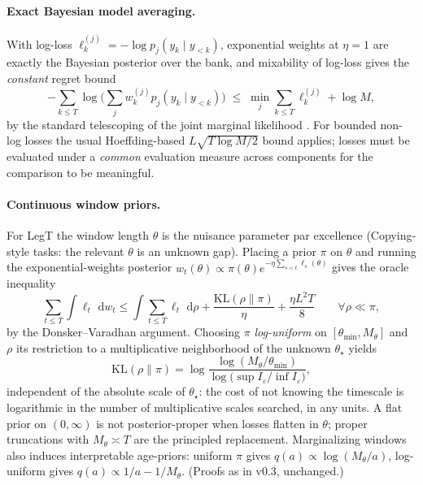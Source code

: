 \documentclass[11pt]{article}
\newcommand{\dd}{\,\mathrm{d}}
\newcommand{\KL}{\mathrm{KL}}
\begin{document}
\paragraph{Exact Bayesian model averaging.} With log-loss $\ell^{(j)}_k=-\log p_j(y_k\mid y_{<k})$, exponential weights at $\eta=1$ are exactly the Bayesian posterior over the bank, and mixability of log-loss gives the \emph{constant} regret bound
\begin{equation}
    -\sum_{k\le T}\log\Big(\textstyle\sum_j w^{(j)}_k p_j(y_k\mid y_{<k})\Big)
    \;\le\;
    \min_{j}\sum_{k\le T}\ell^{(j)}_k+\log M,
\end{equation}
by the standard telescoping of the joint marginal likelihood \citep{vovk1998mixability,cesa2006prediction}. For bounded non-log losses the usual Hoeffding-based $L\sqrt{T\log M/2}$ bound applies; losses must be evaluated under a \emph{common} evaluation measure across components for the comparison to be meaningful.

\paragraph{Continuous window priors.} For LegT the window length $\theta$ is the nuisance parameter par excellence (Copying-style tasks: the relevant $\theta$ is an unknown gap). Placing a prior $\pi$ on $\theta$ and running the exponential-weights posterior $w_t(\theta)\propto\pi(\theta)e^{-\eta\sum_{s<t}\ell_s(\theta)}$ gives the oracle inequality
\begin{equation}
    \sum_{t\le T}\int\ell_t\,\dd w_t
    \le \int\sum_{t\le T}\ell_t\,\dd\rho+\frac{\KL(\rho\|\pi)}{\eta}+\frac{\eta L^2T}{8}
    \qquad\forall\rho\ll\pi,
\end{equation}
by the Donsker--Varadhan argument. Choosing $\pi$ \emph{log-uniform} on $[\theta_{\min},M_\theta]$ and $\rho$ its restriction to a multiplicative neighborhood of the unknown $\theta_\star$ yields
\begin{equation}
    \KL(\rho\|\pi)=\log\frac{\log(M_\theta/\theta_{\min})}{\log\big(\sup I_\varepsilon/\inf I_\varepsilon\big)},
\end{equation}
independent of the absolute scale of $\theta_\star$: the cost of not knowing the timescale is logarithmic in the number of multiplicative scales searched, in any units. A flat prior on $(0,\infty)$ is not posterior-proper when losses flatten in $\theta$; proper truncations with $M_\theta\asymp T$ are the principled replacement. Marginalizing windows also induces interpretable age-priors: uniform $\pi$ gives $q(a)\propto\log(M_\theta/a)$, log-uniform gives $q(a)\propto 1/a-1/M_\theta$. (Proofs as in v0.3, unchanged.)
\end{document}
